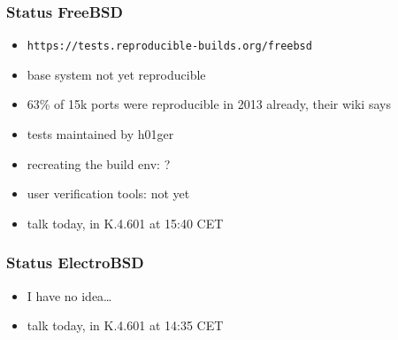\documentclass[14pt]{beamer}
\begin{document}
\begin{frame}
 \frametitle{Status FreeBSD}
 \begin{itemize}
  \item \texttt{https://tests.reproducible-builds.org/freebsd}
  \item base system not yet reproducible
  \item 63\% of 15k ports were reproducible in 2013 already, their wiki says
  \item tests maintained by h01ger
  \item recreating the build env: ?
  \item user verification tools: not yet
  \item talk today, in K.4.601 at 15:40 CET
 \end{itemize}
\end{frame}

\begin{frame}
 \frametitle{Status ElectroBSD}
 \begin{itemize}
  \item I have no idea…
  \item talk today, in K.4.601 at 14:35 CET
 \end{itemize}
\end{frame}
\end{document}

